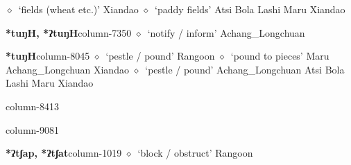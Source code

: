 \hspace{1ex}
         $\diamond$~`fields (wheat etc.)'
         Xiandao 
\hspace{1ex}
         $\diamond$~`paddy fields'
         Atsi 
\hspace{1ex}
         Bola 
\hspace{1ex}
         Lashi 
\hspace{1ex}
         Maru 
\hspace{1ex}
         Xiandao 
  \item {\footnotesize \textbf{*tuŋH, *ʔtuŋH}}{\tiny column-7350}
         $\diamond$~`notify / inform'
         Achang\_Longchuan 
  \item {\footnotesize \textbf{*tuŋH}}{\tiny column-8045}
         $\diamond$~`pestle / pound'
         Rangoon 
\hspace{1ex}
         $\diamond$~`pound to pieces'
         Maru 
\hspace{1ex}
         Achang\_Longchuan 
\hspace{1ex}
         Xiandao 
\hspace{1ex}
         $\diamond$~`pestle / pound'
         Achang\_Longchuan 
\hspace{1ex}
         Atsi 
\hspace{1ex}
         Bola 
\hspace{1ex}
         Lashi 
\hspace{1ex}
         Maru 
\hspace{1ex}
         Xiandao 
  \item {\footnotesize \textbf{}}{\tiny column-8413}
  \item {\footnotesize \textbf{}}{\tiny column-9081}
  \item {\footnotesize \textbf{*ʔtʃap, *ʔtʃat}}{\tiny column-1019}
         $\diamond$~`block / obstruct'
         Rangoon 
\hspace{1ex}
